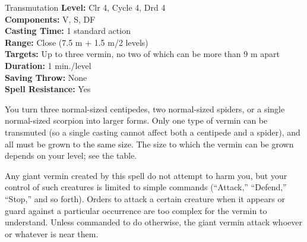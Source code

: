 {Transmutation}
{
	\textbf{Level:}
	Clr 4, Cycle 4, Drd 4\\
	\textbf{Components:}
	V, S, DF\\
	\textbf{Casting Time:}
	1 standard action\\
	\textbf{Range:}
	Close (7.5 m + 1.5 m/2 levels)\\
	\textbf{Targets:}
	Up to three vermin, no two of which can be more than 9 m apart\\
	\textbf{Duration:}
	1 min./level\\
	\textbf{Saving Throw:}
	None\\
	\textbf{Spell Resistance:}
	Yes\\
}
{

	You turn three normal-sized centipedes, two normal-sized spiders, or a single normal-sized scorpion into larger forms. Only one type of vermin can be transmuted (so a single casting cannot affect both a centipede and a spider), and all must be grown to the same size. The size to which the vermin can be grown depends on your level; see the table.

	Any giant vermin created by this spell do not attempt to harm you, but your control of such creatures is limited to simple commands (``Attack,'' ``Defend,'' ``Stop,'' and so forth). Orders to attack a certain creature when it appears or guard against a particular occurrence are too complex for the vermin to understand. Unless commanded to do otherwise, the giant vermin attack whoever or whatever is near them.

}
